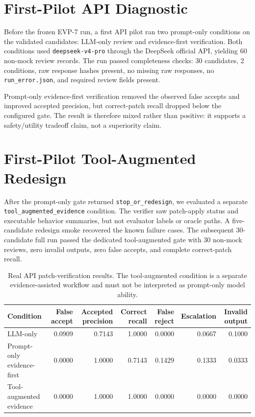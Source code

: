 \documentclass[conference]{IEEEtran}
\begin{document}
\section{First-Pilot API Diagnostic}

Before the frozen EVP-7 run, a first API pilot ran two prompt-only conditions
on the validated candidates:
LLM-only review and evidence-first verification. Both conditions used
\texttt{deepseek-v4-pro} through the DeepSeek official API, yielding 60
non-mock review records. The run passed completeness checks: 30 candidates, 2
conditions, raw response hashes present, no missing raw responses, no
\texttt{run\_error.json}, and required review fields present.

Prompt-only evidence-first verification removed the observed false accepts and
improved accepted precision, but correct-patch recall dropped below the
configured gate. The result is therefore mixed rather than positive: it
supports a safety/utility tradeoff claim, not a superiority claim.

\section{First-Pilot Tool-Augmented Redesign}

After the prompt-only gate returned \texttt{stop\_or\_redesign}, we evaluated
a separate \texttt{tool\_augmented\_evidence} condition. The verifier saw
patch-apply status and executable behavior summaries, but not evaluator labels
or oracle paths. A five-candidate redesign smoke recovered the known failure
cases. The subsequent 30-candidate full run passed the dedicated
tool-augmented gate with 30 non-mock reviews, zero invalid outputs, zero false
accepts, and complete correct-patch recall.


\begin{table}[t]
\centering
\caption{Real API patch-verification results. The tool-augmented condition is a separate evidence-assisted workflow and must not be interpreted as prompt-only model ability.}
\label{tab:api-results}
\begin{tabular}{lrrrrrr}
\toprule
Condition & False accept & Accepted precision & Correct recall & False reject & Escalation & Invalid output \\
\midrule
LLM-only & 0.0909 & 0.7143 & 1.0000 & 0.0000 & 0.0667 & 0.1000 \\
Prompt-only evidence-first & 0.0000 & 1.0000 & 0.7143 & 0.1429 & 0.1333 & 0.0333 \\
Tool-augmented evidence & 0.0000 & 1.0000 & 1.0000 & 0.0000 & 0.0000 & 0.0000 \\
\bottomrule
\end{tabular}
\end{table}
\end{document}
